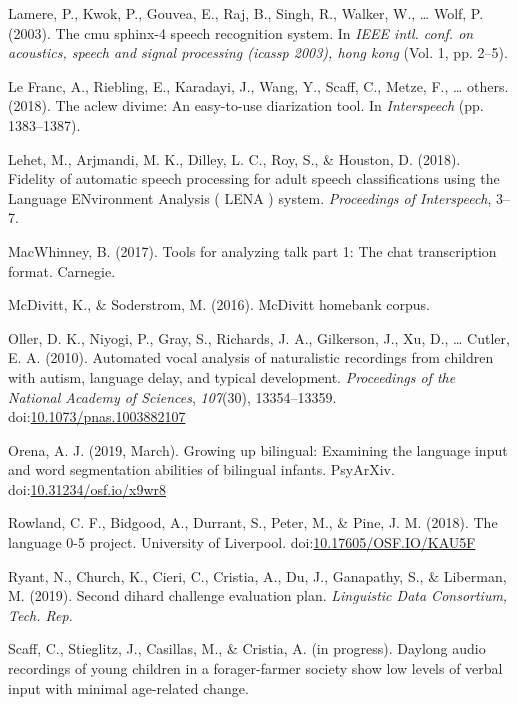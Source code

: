 \documentclass[english,floatsintext,man]{apa6}
\begin{document}
\hypertarget{ref-lamere2003cmu}{}
Lamere, P., Kwok, P., Gouvea, E., Raj, B., Singh, R., Walker, W.,
\ldots{} Wolf, P. (2003). The cmu sphinx-4 speech recognition system. In
\emph{IEEE intl. conf. on acoustics, speech and signal processing
(icassp 2003), hong kong} (Vol. 1, pp. 2--5).

\hypertarget{ref-le2018aclew}{}
Le Franc, A., Riebling, E., Karadayi, J., Wang, Y., Scaff, C., Metze,
F., \ldots{} others. (2018). The aclew divime: An easy-to-use
diarization tool. In \emph{Interspeech} (pp. 1383--1387).

\hypertarget{ref-Lehet2018}{}
Lehet, M., Arjmandi, M. K., Dilley, L. C., Roy, S., \& Houston, D.
(2018). Fidelity of automatic speech processing for adult speech
classifications using the Language ENvironment Analysis ( LENA ) system.
\emph{Proceedings of Interspeech}, 3--7.

\hypertarget{ref-macwhinney2017tools}{}
MacWhinney, B. (2017). Tools for analyzing talk part 1: The chat
transcription format. Carnegie.

\hypertarget{ref-mcdivitt2016mcdivitt}{}
McDivitt, K., \& Soderstrom, M. (2016). McDivitt homebank corpus.

\hypertarget{ref-Oller}{}
Oller, D. K., Niyogi, P., Gray, S., Richards, J. A., Gilkerson, J., Xu,
D., \ldots{} Cutler, E. A. (2010). Automated vocal analysis of
naturalistic recordings from children with autism, language delay, and
typical development. \emph{Proceedings of the National Academy of
Sciences}, \emph{107}(30), 13354--13359.
doi:\href{https://doi.org/10.1073/pnas.1003882107}{10.1073/pnas.1003882107}

\hypertarget{ref-orena_2019}{}
Orena, A. J. (2019, March). Growing up bilingual: Examining the language
input and word segmentation abilities of bilingual infants. PsyArXiv.
doi:\href{https://doi.org/10.31234/osf.io/x9wr8}{10.31234/osf.io/x9wr8}

\hypertarget{ref-rowland2018}{}
Rowland, C. F., Bidgood, A., Durrant, S., Peter, M., \& Pine, J. M.
(2018). The language 0-5 project. University of Liverpool.
doi:\href{https://doi.org/10.17605/OSF.IO/KAU5F}{10.17605/OSF.IO/KAU5F}

\hypertarget{ref-ryant2019second}{}
Ryant, N., Church, K., Cieri, C., Cristia, A., Du, J., Ganapathy, S., \&
Liberman, M. (2019). Second dihard challenge evaluation plan.
\emph{Linguistic Data Consortium, Tech. Rep}.

\hypertarget{ref-scaff}{}
Scaff, C., Stieglitz, J., Casillas, M., \& Cristia, A. (in progress).
Daylong audio recordings of young children in a forager-farmer society
show low levels of verbal input with minimal age-related change.
\end{document}
